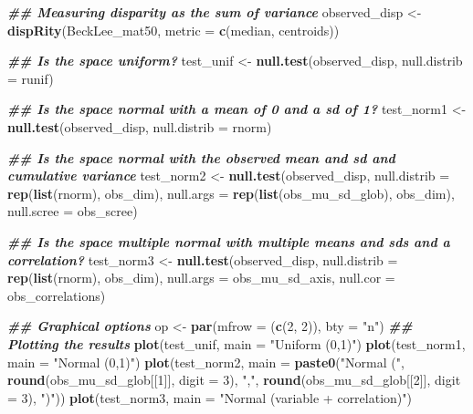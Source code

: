 \documentclass[
]{book}
\newenvironment{Shaded}{\begin{snugshade}}{\end{snugshade}}
\newcommand{\AttributeTok}[1]{\textcolor[rgb]{0.13,0.29,0.53}{#1}}
\newcommand{\DecValTok}[1]{\textcolor[rgb]{0.00,0.00,0.81}{#1}}
\newcommand{\DocumentationTok}[1]{\textcolor[rgb]{0.56,0.35,0.01}{\textbf{\textit{#1}}}}
\newcommand{\FunctionTok}[1]{\textcolor[rgb]{0.13,0.29,0.53}{\textbf{#1}}}
\newcommand{\NormalTok}[1]{#1}
\newcommand{\OtherTok}[1]{\textcolor[rgb]{0.56,0.35,0.01}{#1}}
\newcommand{\StringTok}[1]{\textcolor[rgb]{0.31,0.60,0.02}{#1}}
\begin{document}
\begin{Shaded}
\begin{Highlighting}[]
\DocumentationTok{\#\# Measuring disparity as the sum of variance}
\NormalTok{observed\_disp }\OtherTok{\textless{}{-}} \FunctionTok{dispRity}\NormalTok{(BeckLee\_mat50, }\AttributeTok{metric =} \FunctionTok{c}\NormalTok{(median, centroids))}

\DocumentationTok{\#\# Is the space uniform?}
\NormalTok{test\_unif }\OtherTok{\textless{}{-}} \FunctionTok{null.test}\NormalTok{(observed\_disp, }\AttributeTok{null.distrib =}\NormalTok{ runif)}

\DocumentationTok{\#\# Is the space normal with a mean of 0 and a sd of 1?}
\NormalTok{test\_norm1 }\OtherTok{\textless{}{-}} \FunctionTok{null.test}\NormalTok{(observed\_disp, }\AttributeTok{null.distrib =}\NormalTok{ rnorm)}

\DocumentationTok{\#\# Is the space normal with the observed mean and sd and cumulative variance}
\NormalTok{test\_norm2 }\OtherTok{\textless{}{-}} \FunctionTok{null.test}\NormalTok{(observed\_disp, }\AttributeTok{null.distrib =} \FunctionTok{rep}\NormalTok{(}\FunctionTok{list}\NormalTok{(rnorm), obs\_dim),}
                        \AttributeTok{null.args =} \FunctionTok{rep}\NormalTok{(}\FunctionTok{list}\NormalTok{(obs\_mu\_sd\_glob), obs\_dim),}
                        \AttributeTok{null.scree =}\NormalTok{ obs\_scree)}

\DocumentationTok{\#\# Is the space multiple normal with multiple means and sds and a correlation?}
\NormalTok{test\_norm3 }\OtherTok{\textless{}{-}} \FunctionTok{null.test}\NormalTok{(observed\_disp, }\AttributeTok{null.distrib =} \FunctionTok{rep}\NormalTok{(}\FunctionTok{list}\NormalTok{(rnorm), obs\_dim),}
                        \AttributeTok{null.args =}\NormalTok{ obs\_mu\_sd\_axis, }\AttributeTok{null.cor =}\NormalTok{ obs\_correlations)}

\DocumentationTok{\#\# Graphical options}
\NormalTok{op }\OtherTok{\textless{}{-}} \FunctionTok{par}\NormalTok{(}\AttributeTok{mfrow =}\NormalTok{ (}\FunctionTok{c}\NormalTok{(}\DecValTok{2}\NormalTok{, }\DecValTok{2}\NormalTok{)), }\AttributeTok{bty =} \StringTok{"n"}\NormalTok{)}
\DocumentationTok{\#\# Plotting the results}
\FunctionTok{plot}\NormalTok{(test\_unif, }\AttributeTok{main =} \StringTok{"Uniform (0,1)"}\NormalTok{)}
\FunctionTok{plot}\NormalTok{(test\_norm1, }\AttributeTok{main =} \StringTok{"Normal (0,1)"}\NormalTok{)}
\FunctionTok{plot}\NormalTok{(test\_norm2, }\AttributeTok{main =} \FunctionTok{paste0}\NormalTok{(}\StringTok{"Normal ("}\NormalTok{, }\FunctionTok{round}\NormalTok{(obs\_mu\_sd\_glob[[}\DecValTok{1}\NormalTok{]], }\AttributeTok{digit =} \DecValTok{3}\NormalTok{),}
                              \StringTok{","}\NormalTok{, }\FunctionTok{round}\NormalTok{(obs\_mu\_sd\_glob[[}\DecValTok{2}\NormalTok{]], }\AttributeTok{digit =} \DecValTok{3}\NormalTok{), }\StringTok{")"}\NormalTok{))}
\FunctionTok{plot}\NormalTok{(test\_norm3, }\AttributeTok{main =} \StringTok{"Normal (variable + correlation)"}\NormalTok{)}
\end{Highlighting}
\end{Shaded}
\end{document}
